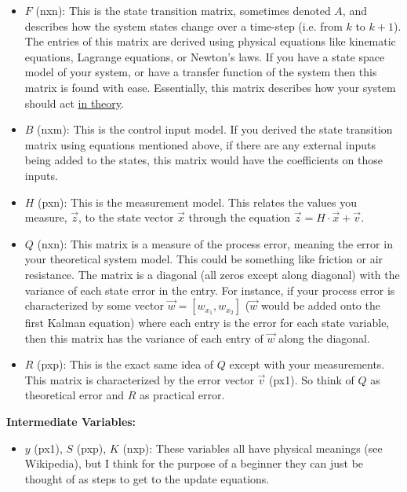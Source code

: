 \documentclass{article} %
\begin{document}
\begin{itemize}
\item $F$ (nxn): This is the state transition matrix, sometimes denoted $A$, and describes how the system states change over a time-step (i.e. from $k$ to $k+1$). The entries of this matrix are derived using physical equations like kinematic equations, Lagrange equations, or Newton's laws. If you have a state space model of your system, or have a transfer function of the system then this matrix is found with ease. Essentially, this matrix describes how your system should act \underline{in theory}.
\item $B$ (nxm): This is the control input model. If you derived the state transition matrix using equations mentioned above, if there are any external inputs being added to the states, this matrix would have the coefficients on those inputs.
\item $H$ (pxn): This is the measurement model. This relates the values you measure, $\vec{z}$, to the state vector $\vec{x}$ through the equation $\vec{z} = H \cdot \vec{x} + \vec{v}$.
\item $Q$ (nxn): This matrix is a measure of the process error, meaning the error in your theoretical system model. This could be something like friction or air resistance. The matrix is a diagonal (all zeros except along diagonal) with the variance of each state error in the entry. For instance, if your process error is characterized by some vector $\vec{w} = [w_{x_1}, w_{x_2}]$ ($\vec{w}$ would be added onto the first Kalman equation) where each entry is the error for each state variable, then this matrix has the variance of each entry of $\vec{w}$ along the diagonal.
\item $R$ (pxp): This is the exact same idea of $Q$ except with your measurements. This matrix is characterized by the error vector $\vec{v}$ (px1). So think of $Q$ as theoretical error and $R$ as practical error.
\end{itemize}
\textbf{Intermediate Variables: }
\begin{itemize}
\item $y$ (px1), $S$ (pxp), $K$ (nxp): These variables all have physical meanings (see Wikipedia), but I think for the purpose of a beginner they can just be thought of as steps to get to the update equations.
\end{itemize}
\end{document}
